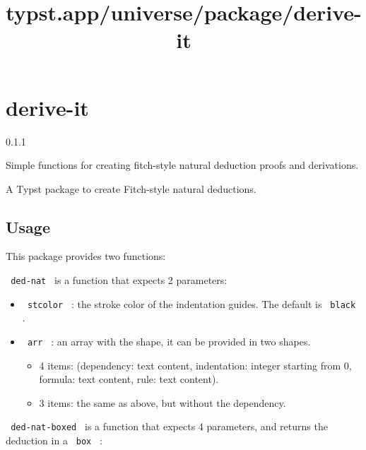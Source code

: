 \title{typst.app/universe/package/derive-it}

\label{banner}
\section{derive-it}\label{derive-it}

{ 0.1.1 }

Simple functions for creating fitch-style natural deduction proofs and
derivations.

\label{readme}
A Typst package to create Fitch-style natural deductions.


\subsection{Usage}\label{usage}

This package provides two functions:

\texttt{\ ded-nat\ } is a function that expects 2 parameters:

\begin{itemize}
\tightlist
\item
  \texttt{\ stcolor\ } : the stroke color of the indentation guides. The
  default is \texttt{\ black\ } .
\item
  \texttt{\ arr\ } : an array with the shape, it can be provided in two
  shapes.

  \begin{itemize}
  \tightlist
  \item
    4 items: (dependency: text content, indentation: integer starting
    from 0, formula: text content, rule: text content).
  \item
    3 items: the same as above, but without the dependency.
  \end{itemize}
\end{itemize}

\texttt{\ ded-nat-boxed\ } is a function that expects 4 parameters, and
returns the deduction in a \texttt{\ box\ } :

